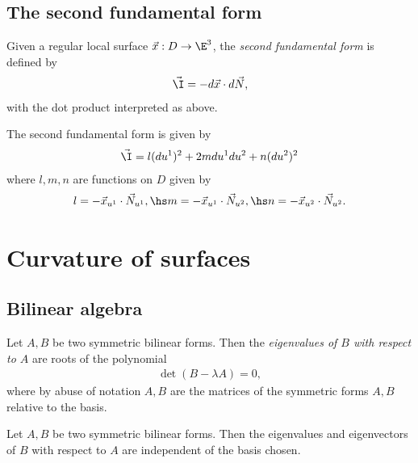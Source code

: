 \documentclass{article}
\begin{document}
\subsection{The second fundamental form}


\begin{definition}
    Given a regular local surface $\vec x: D\to\E^3$, the \emph{second fundamental form}
    is defined by 
    \begin{align*}
        \vec\I = -d\vec x\cdot d\vec N,
    \end{align*}
    with the dot product interpreted as above.
\end{definition}

\begin{proposition}
    The second fundamental form is given by
    \begin{align*}
        \vec\I = l(du^1)^2 + 2mdu^1du^2+n(du^2)^2
    \end{align*}
    where $l,m,n$ are functions on $D$ given by
    \begin{align*}
        l=-\vec x_{u^1}\cdot\vec N_{u^1}, \hs 
        m=-\vec x_{u^1}\cdot\vec N_{u^2}, \hs 
        n=-\vec x_{u^2}\cdot\vec N_{u^2}.
    \end{align*}
\end{proposition}

\section{Curvature of surfaces}

\subsection{Bilinear algebra}

\begin{definition}
    Let $A,B$ be two symmetric bilinear forms. Then the \emph{eigenvalues of $B$ with respect to $A$} 
    are roots of the polynomial 
    \begin{align*}
        \det(B-\lambda A) = 0,
    \end{align*}
    where by abuse of notation $A,B$ are the matrices of the symmetric forms $A,B$ relative to the 
    basis.
\end{definition}

\begin{lemma}
    Let $A,B$ be two symmetric bilinear forms. Then the eigenvalues and eigenvectors of $B$ with respect 
    to $A$ are independent of the basis chosen.
\end{lemma}
\end{document}
